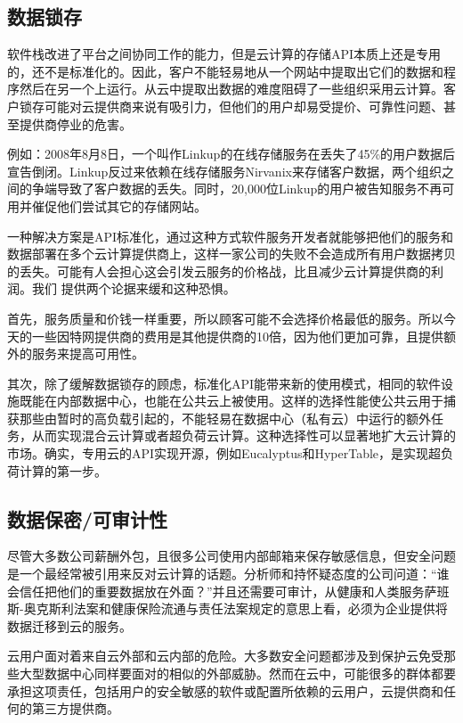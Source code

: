 \subsection{数据锁存}

软件栈改进了平台之间协同工作的能力，但是云计算的存储API本质上还是专用的，还不是标准化的。因此，客户不能轻易地从一个网站中提取出它们的数据和程序然后在另一个上运行。从云中提取出数据的难度阻碍了一些组织采用云计算。客户锁存可能对云提供商来说有吸引力，但他们的用户却易受提价、可靠性问题、甚至提供商停业的危害。

例如：2008年8月8日，一个叫作Linkup的在线存储服务在丢失了45\%的用户数据后宣告倒闭。Linkup反过来依赖在线存储服务Nirvanix来存储客户数据，两个组织之间的争端导致了客户数据的丢失。同时，20,000位Linkup的用户被告知服务不再可用并催促他们尝试其它的存储网站。

一种解决方案是API标准化，通过这种方式软件服务开发者就能够把他们的服务和数据部署在多个云计算提供商上，这样一家公司的失败不会造成所有用户数据拷贝的丢失。可能有人会担心这会引发云服务的价格战，比且减少云计算提供商的利润。我们
提供两个论据来缓和这种恐惧。

首先，服务质量和价钱一样重要，所以顾客可能不会选择价格最低的服务。所以今天的一些因特网提供商的费用是其他提供商的10倍，因为他们更加可靠，且提供额外的服务来提高可用性。

其次，除了缓解数据锁存的顾虑，标准化API能带来新的使用模式，相同的软件设施既能在内部数据中心，也能在公共云上被使用。这样的选择性能使公共云用于捕获那些由暂时的高负载引起的，不能轻易在数据中心（私有云）中运行的额外任务，从而实现混合云计算或者超负荷云计算。这种选择性可以显著地扩大云计算的市场。确实，专用云的API实现开源，例如Eucalyptus和HyperTable，是实现超负荷计算的第一步。

\subsection{数据保密/可审计性}

尽管大多数公司薪酬外包，且很多公司使用内部邮箱来保存敏感信息，但安全问题是一个最经常被引用来反对云计算的话题。分析师和持怀疑态度的公司问道：“谁会信任把他们的重要数据放在外面？”并且还需要可审计，从健康和人类服务萨班斯-奥克斯利法案和健康保险流通与责任法案规定的意思上看，必须为企业提供将数据迁移到云的服务。

云用户面对着来自云外部和云内部的危险。大多数安全问题都涉及到保护云免受那些大型数据中心同样要面对的相似的外部威胁。然而在云中，可能很多的群体都要承担这项责任，包括用户的安全敏感的软件或配置所依赖的云用户，云提供商和任何的第三方提供商。


